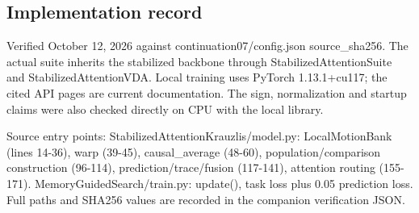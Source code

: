 \documentclass[11pt,letterpaper]{article}
\begin{document}
\subsection*{Implementation record}

{
\small\color{muted} Verified October 12, 2026 against continuation07/\allowbreak{}config.json source\_sha256. The actual suite inherits the stabilized backbone through StabilizedAttentionSuite and StabilizedAttentionVDA. Local training uses PyTorch 1.13.1+cu117; the cited API pages are current documentation. The sign, normalization and startup claims were also checked directly on CPU with the local library.\par}


{
\small\color{muted} Source entry points: StabilizedAttentionKrauzlis/\allowbreak{}model.py: LocalMotionBank (lines 14-36), warp (39-45), causal\_average (48-60), population/\allowbreak{}comparison construction (96-114), prediction/\allowbreak{}trace/\allowbreak{}fusion (117-141), attention routing (155-171). MemoryGuidedSearch/\allowbreak{}train.py: update(), task loss plus 0.05 prediction loss. Full paths and SHA256 values are recorded in the companion verification JSON.\par}
\end{document}
